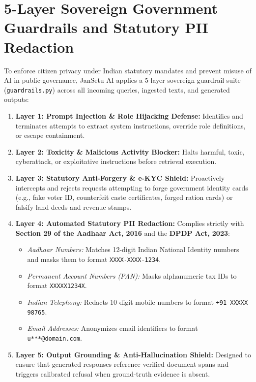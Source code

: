 \documentclass[12pt,a4paper,oneside]{report}
\begin{document}
\section{5-Layer Sovereign Government Guardrails and Statutory PII Redaction}
To enforce citizen privacy under Indian statutory mandates and prevent misuse of AI in public governance, JanSetu AI applies a 5-layer sovereign guardrail suite (\texttt{guardrails.py}) across all incoming queries, ingested texts, and generated outputs:
\begin{enumerate}[itemsep=2pt]
    \item \textbf{Layer 1: Prompt Injection \& Role Hijacking Defense:} Identifies and terminates attempts to extract system instructions, override role definitions, or escape containment.
    \item \textbf{Layer 2: Toxicity \& Malicious Activity Blocker:} Halts harmful, toxic, cyberattack, or exploitative instructions before retrieval execution.
    \item \textbf{Layer 3: Statutory Anti-Forgery \& e-KYC Shield:} Proactively intercepts and rejects requests attempting to forge government identity cards (e.g., fake voter ID, counterfeit caste certificates, forged ration cards) or falsify land deeds and revenue stamps.
    \item \textbf{Layer 4: Automated Statutory PII Redaction:} Complies strictly with \textbf{Section 29 of the Aadhaar Act, 2016} and the \textbf{DPDP Act, 2023}:
    \begin{itemize}[itemsep=1pt]
        \item \textit{Aadhaar Numbers:} Matches 12-digit Indian National Identity numbers and masks them to format \texttt{XXXX-XXXX-1234}.
        \item \textit{Permanent Account Numbers (PAN):} Masks alphanumeric tax IDs to format \texttt{XXXXX1234X}.
        \item \textit{Indian Telephony:} Redacts 10-digit mobile numbers to format \texttt{+91-XXXXX-98765}.
        \item \textit{Email Addresses:} Anonymizes email identifiers to format \texttt{u***@domain.com}.
    \end{itemize}
    \item \textbf{Layer 5: Output Grounding \& Anti-Hallucination Shield:} Designed to ensure that generated responses reference verified document spans and triggers calibrated refusal when ground-truth evidence is absent.
\end{enumerate}
\end{document}
